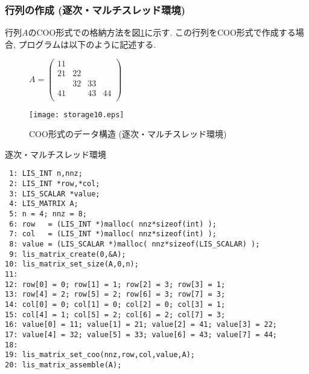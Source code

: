 \documentclass[a4paper]{jarticle}
\begin{document}
{{\subsubsection{行列の作成 (逐次・マルチスレッド環境)}
行列$A$のCOO形式での格納方法を図\ref{fig:storage10}に示す. 
この行列をCOO形式で作成する場合, プログラムは以下のように記述する. 
\begin{figure}[h]
{\centering 
\begin{minipage}{0.3\textwidth}
\begin{flushright}
$ 
A = \left(
\begin{array}{cccc}
11 &    &    &    \\
21 & 22 &    &    \\
   & 32 & 33 &    \\
41 &    & 43 & 44 \\
\end{array}\right)
$
\end{flushright}
\end{minipage}
\begin{minipage}{0.6\textwidth}
\begin{flushleft}
\texttt{[image: storage10.eps]} 
\end{flushleft}
\end{minipage}
\caption{COO形式のデータ構造 (逐次・マルチスレッド環境)}\label{fig:storage10}}
\end{figure}
\begin{itembox}[l]{逐次・マルチスレッド環境}
\small
\begin{verbatim}
 1: LIS_INT n,nnz;
 2: LIS_INT *row,*col;
 3: LIS_SCALAR *value;
 4: LIS_MATRIX A;
 5: n = 4; nnz = 8;
 6: row   = (LIS_INT *)malloc( nnz*sizeof(int) );
 7: col   = (LIS_INT *)malloc( nnz*sizeof(int) );
 8: value = (LIS_SCALAR *)malloc( nnz*sizeof(LIS_SCALAR) );
 9: lis_matrix_create(0,&A);
10: lis_matrix_set_size(A,0,n);
11:
12: row[0] = 0; row[1] = 1; row[2] = 3; row[3] = 1;
13: row[4] = 2; row[5] = 2; row[6] = 3; row[7] = 3;
14: col[0] = 0; col[1] = 0; col[2] = 0; col[3] = 1;
15: col[4] = 1; col[5] = 2; col[6] = 2; col[7] = 3;
16: value[0] = 11; value[1] = 21; value[2] = 41; value[3] = 22;
17: value[4] = 32; value[5] = 33; value[6] = 43; value[7] = 44;
18:
19: lis_matrix_set_coo(nnz,row,col,value,A);
20: lis_matrix_assemble(A);
\end{verbatim}
\end{itembox}

\newpage
}}
\end{document}
